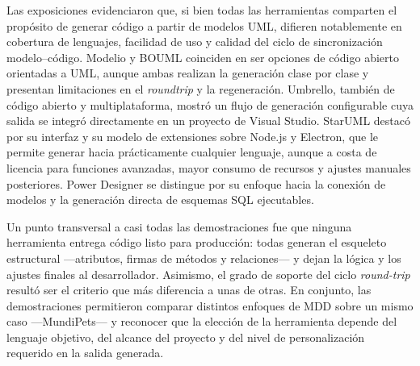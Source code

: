 \documentclass[journal,onecolumn]{IEEEtran}
\begin{document}
	Las exposiciones evidenciaron que, si bien todas las herramientas comparten el propósito de generar código a partir de modelos UML, difieren notablemente en cobertura de lenguajes, facilidad de uso y calidad del ciclo de sincronización modelo--código. Modelio y BOUML coinciden en ser opciones de código abierto orientadas a UML, aunque ambas realizan la generación clase por clase y presentan limitaciones en el \textit{roundtrip} y la regeneración. Umbrello, también de código abierto y multiplataforma, mostró un flujo de generación configurable cuya salida se integró directamente en un proyecto de Visual Studio. StarUML destacó por su interfaz y su modelo de extensiones sobre Node.js y Electron, que le permite generar hacia prácticamente cualquier lenguaje, aunque a costa de licencia para funciones avanzadas, mayor consumo de recursos y ajustes manuales posteriores. Power Designer se distingue por su enfoque hacia la conexión de modelos y la generación directa de esquemas SQL ejecutables.
	
	Un punto transversal a casi todas las demostraciones fue que ninguna herramienta entrega código listo para producción: todas generan el esqueleto estructural —atributos, firmas de métodos y relaciones— y dejan la lógica y los ajustes finales al desarrollador. Asimismo, el grado de soporte del ciclo \textit{round-trip} resultó ser el criterio que más diferencia a unas de otras. En conjunto, las demostraciones permitieron comparar distintos enfoques de MDD sobre un mismo caso —MundiPets— y reconocer que la elección de la herramienta depende del lenguaje objetivo, del alcance del proyecto y del nivel de personalización requerido en la salida generada.
	
\end{document}
